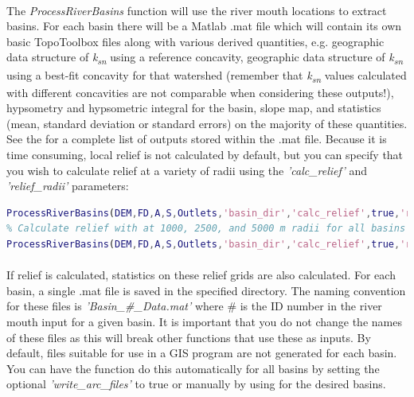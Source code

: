\paragraph{}The \textit{ProcessRiverBasins} function will use the river mouth locations to extract basins. For each basin there will be a Matlab .mat file which will contain its own basic TopoToolbox files along with various derived quantities, e.g. geographic data structure of \textit{k\textsubscript{sn}} using a reference concavity, geographic data structure of \textit{k\textsubscript{sn}} using a best-fit concavity for that watershed (remember that \textit{k\textsubscript{sn}} values calculated with different concavities are not comparable when considering these outputs!), hypsometry and hypsometric integral for the basin, slope map, and statistics (mean, standard deviation or standard errors) on the majority of these quantities. See the  for a complete list of outputs stored within the .mat file. Because it is time consuming, local relief is not calculated by default, but you can specify that you wish to calculate relief at a variety of radii using the \textit{'calc\_relief'} and \textit{'relief\_radii'} parameters:

\begin{lstlisting}[language=Matlab]
% Calculate relief with a radius of 2500 m for all basins
ProcessRiverBasins(DEM,FD,A,S,Outlets,'basin_dir','calc_relief',true,'relief_radii',2500);
% Calculate relief with at 1000, 2500, and 5000 m radii for all basins
ProcessRiverBasins(DEM,FD,A,S,Outlets,'basin_dir','calc_relief',true,'relief_radii',[1000 2500 5000]);
\end{lstlisting}

\paragraph{}If relief is calculated, statistics on these relief grids are also calculated. For each basin, a single .mat file is saved in the specified directory. The naming convention for these files is \textit{'Basin\_\#\_Data.mat'} where \# is the ID number in the river mouth input for a given basin. It is important that you do not change the names of these files as this will break other functions that use these as inputs. By default, files suitable for use in a GIS program are not generated for each basin. You can have the function do this automatically for all basins by setting the optional \textit{'write\_arc\_files'} to true or manually by using  for the desired basins.

